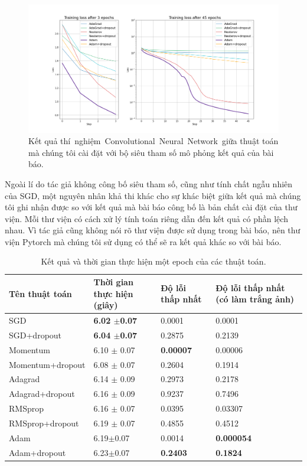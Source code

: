 \begin{figure}[htp]
	\centering
	\includegraphics[width=140 mm]{images/cnn-rep.png}
	\caption{Kết quả thí nghiệm Convolutional Neural Network giữa thuật toán mà chúng tôi cài đặt với bộ siêu tham số mô phỏng kết quả của bài báo.}
	\label{fig:exp-cnn-rep}
\end{figure}

Ngoài lí do tác giả không công bố siêu tham số, cũng như tính chất ngẫu nhiên của SGD, một nguyên nhân khả thi khác cho sự khác biệt giữa kết quả mà chúng tôi ghi nhận được so với kết quả mà bài báo công bố là bản chất cài đặt của thư viện. Mỗi thư viện có cách xử lý tính toán riêng dẫn đến kết quả có phần lệch nhau. Vì tác giả cũng không nói rõ thư viện được sử dụng trong bài báo, nên thư viện Pytorch mà chúng tôi sử dụng có thể sẽ ra kết quả khác so với bài báo.

\begin{table}
	\begin{tabular}{|l|m{}|m{}|m{}|}
		\hline
		Tên thuật toán & Thời gian thực hiện (giây) & Độ lỗi thấp nhất & Độ lỗi thấp nhất (có làm trắng ảnh) \\
		\hline
		SGD         & \textbf{6.02 $\pm $0.07} & 0.0001 & 0.0001 \\
		SGD+dropout & \textbf{6.04 $\pm $0.07} & 0.2875 & 0.2139 \\
		\hline
		Momentum         & 6.10 $\pm$ 0.07 & \textbf{0.00007} & 0.00006 \\
		Momentum+dropout & 6.08 $\pm$ 0.07 & 0.2604 & 0.1914 \\
		\hline
		Adagrad         & 6.14 $\pm$ 0.09 & 0.2973 & 0.2178 \\
		Adagrad+dropout & 6.16 $\pm$ 0.09 & 0.9237 & 0.7496 \\
		\hline
		RMSprop         & 6.16 $\pm$ 0.07 & 0.0395 & 0.03307 \\
		RMSprop+dropout & 6.19 $\pm$ 0.07 & 0.4855 & 0.4512 \\
		\hline
		Adam         & 6.19$\pm$0.07 & 0.0014          & \textbf{0.000054} \\
		Adam+dropout & 6.23$\pm$0.07 & \textbf{0.2403} & \textbf{0.1824} \\
		\hline
	\end{tabular}
\caption{\label{tab:cnn-results}Kết quả và thời gian thực hiện một epoch của các thuật toán.}
\end{table}

